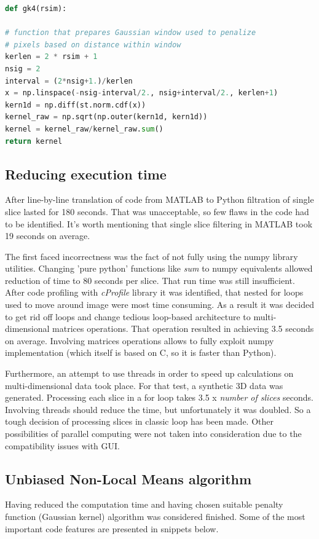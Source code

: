 \begin{lstlisting}[language=Python, caption = Code used for Gaussian kernel generation.]
def gk4(rsim):

# function that prepares Gaussian window used to penalize
# pixels based on distance within window
kerlen = 2 * rsim + 1
nsig = 2
interval = (2*nsig+1.)/kerlen
x = np.linspace(-nsig-interval/2., nsig+interval/2., kerlen+1)
kern1d = np.diff(st.norm.cdf(x))
kernel_raw = np.sqrt(np.outer(kern1d, kern1d))
kernel = kernel_raw/kernel_raw.sum()
return kernel
\end{lstlisting}

\subsection*{Reducing execution time}
After line-by-line translation of code from MATLAB to Python filtration of single slice lasted for 180 seconds. That was unacceptable, so few flaws in the code had to be identified. It's worth mentioning that single slice filtering in MATLAB took 19 seconds on average.

The first faced incorrectness was the fact of not fully using the numpy library utilities. Changing 'pure python' functions like \textit{sum} to numpy equivalents allowed reduction of time to 80 seconds per slice. That run time was still insufficient. After code profiling with \textit{cProfile} library it was identified, that nested for loops used to move around image were most time consuming. As a result it was decided to get rid off loops and change tedious loop-based architecture to multi-dimensional matrices operations. That operation resulted in achieving 3.5 seconds on average. Involving matrices operations allows to fully exploit numpy implementation (which itself is based on C, so it is faster than Python).

Furthermore, an attempt to use threads in order to speed up calculations on multi-dimensional data took place. For that test, a synthetic 3D data was generated. Processing each slice in a for loop takes 3.5 x \textit{number of slices} seconds. Involving threads should reduce the time, but unfortunately it was doubled. So a tough decision of processing slices in classic loop has been made. Other possibilities of parallel computing were not taken into consideration due to the compatibility issues with GUI.

\subsection*{Unbiased Non-Local Means algorithm}
Having reduced the computation time and having chosen suitable penalty function (Gaussian kernel) algorithm was considered finished. Some of the most important code features are presented in snippets below.

